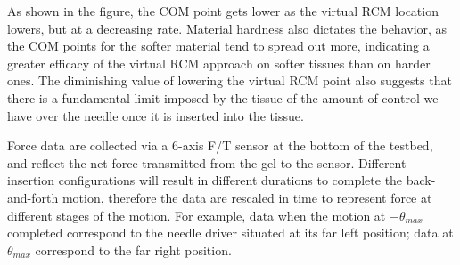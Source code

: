 \begin{table}[h]
\centering
\caption{Experimentally determined COM locations, $E_{com}$, and simulated COM locations, $S_{com}$, for the two gel materials.}
\label{tab:COM_pos_table}
\end{table}

As shown in the figure, the COM point gets lower as the virtual RCM location lowers, but at a decreasing rate. Material hardness also dictates the behavior, as the COM points for the softer material tend to spread out more, indicating a greater efficacy of the virtual RCM approach on softer tissues than on harder ones. The diminishing value of lowering the virtual RCM point also suggests that there is a fundamental limit imposed by the tissue of the amount of control we have over the needle once it is inserted into the tissue.

Force data are collected via a 6-axis F/T sensor at the bottom of the testbed, and reflect the net force transmitted from the gel to the sensor. Different insertion configurations will result in different durations to complete the back-and-forth motion, therefore the data are rescaled in time to represent force at different stages of the motion. For example, data when the motion at $-\theta_{max}$ completed correspond to the needle driver situated at its far left position; data at $\theta_{max}$ correspond to the far right position.


